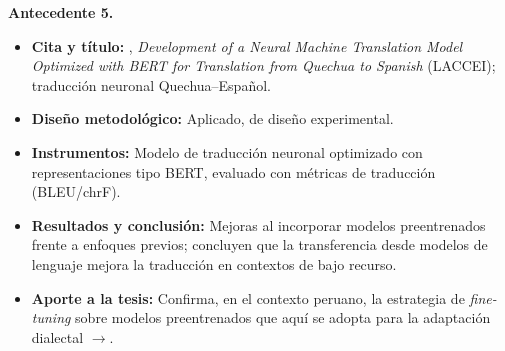 \begin{bloqueObsDos}
\noindent\textbf{Antecedente 5.}
\begin{itemize}\setlength{\itemsep}{1pt}
  \item \textbf{Cita y t{\'i}tulo:} \textcite{CuevaMedina2024}, \emph{Development of a Neural Machine Translation Model Optimized with BERT for Translation from Quechua to Spanish} (LACCEI); traducci{\'o}n neuronal Quechua--Espa{\~n}ol.
  \item \textbf{Dise{\~n}o metodol{\'o}gico:} Aplicado, de dise{\~n}o experimental.
  \item \textbf{Instrumentos:} Modelo de traducci{\'o}n neuronal optimizado con representaciones tipo BERT, evaluado con m{\'e}tricas de traducci{\'o}n (BLEU/chrF).
  \item \textbf{Resultados y conclusi{\'o}n:} Mejoras al incorporar modelos preentrenados frente a enfoques previos; concluyen que la transferencia desde modelos de lenguaje mejora la traducci{\'o}n en contextos de bajo recurso.
  \item \textbf{Aporte a la tesis:} Confirma, en el contexto peruano, la estrategia de \emph{fine-tuning} sobre modelos preentrenados que aqu{\'i} se adopta para la adaptaci{\'o}n dialectal $\to$.
\end{itemize}
\end{bloqueObsDos}

